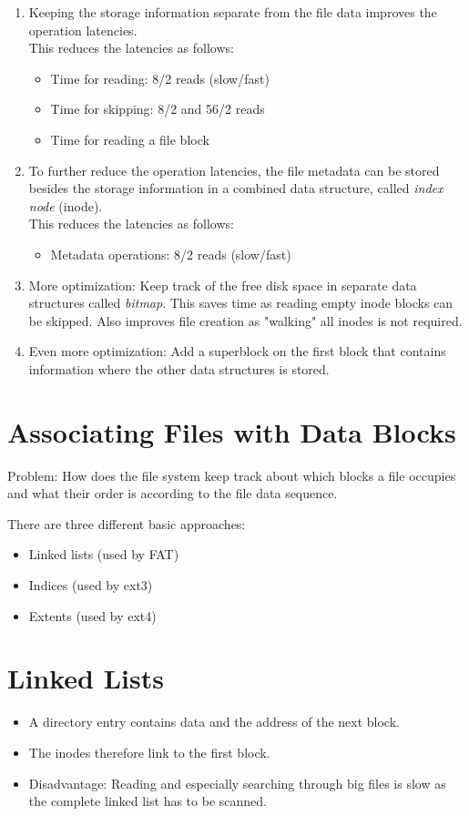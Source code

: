	\begin{enumerate}
		\item Keeping the storage information separate from the file data improves the operation latencies. \\ This reduces the latencies as follows:
			\begin{itemize}
				\item Time for reading: 8/2 reads (slow/fast)
				\item Time for skipping: 8/2 and 56/2 reads
				\item Time for reading a file block
			\end{itemize}
		\item To further reduce the operation latencies, the file metadata can be stored besides the storage information in a combined data structure, called \textit{index node} (inode). \\ This reduces the latencies as follows:
			\begin{itemize}
				\item Metadata operations: 8/2 reads (slow/fast)
			\end{itemize}
		\item More optimization: Keep track of the free disk space in separate data structures called \textit{bitmap}. This saves time as reading empty inode blocks can be skipped. Also improves file creation as "walking" all inodes is not required.
		\item Even more optimization: Add a superblock on the first block that contains information where the other data structures is stored.
	\end{enumerate}

\section{Associating Files with Data Blocks}
	Problem: How does the file system keep track about which blocks a file occupies and what their order is according to the file data sequence.

	There are three different basic approaches:
	\begin{itemize}
		\item Linked lists (used by FAT)
		\item Indices (used by ext3)
		\item Extents (used by ext4)
	\end{itemize}

	\section{Linked Lists}
		\begin{itemize}
			\item A directory entry contains data and the address of the next block.
			\item The inodes therefore link to the first block.
			\item Disadvantage: Reading and especially searching through big files is slow as the complete linked list has to be scanned.
		\end{itemize}

